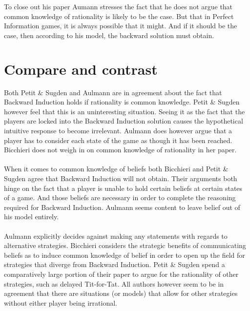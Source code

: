 \documentclass{article}
\begin{document}
\\
\\
To close out his paper Aumann stresses the fact that he does not argue that common knowledge of rationality is likely to be the case. But that in Perfect Information games, it is always possible that it might. And if it should be the case, then according to his model, the backward solution must obtain. 



















\section{Compare and contrast}

Both Petit \& Sugden and Aulmann are in agreement about the fact that Backward Induction holds if rationality is common knowledge. Petit \& Sugden however feel that this is an uninteresting situation. Seeing it as the fact that the players are locked into the Backward Induction solution causes the hypothetical intuitive response to become irrelevant. Aulmann does however argue that a player has to consider each state of the game as though it has been reached. Bicchieri does not weigh in on common knowledge of rationality in her paper.
\\
\\
When it comes to common knowledge of beliefs both Bicchieri and Petit \& Sugden agree that Backward Induction will not obtain. Their arguments both hinge on the fact that a player is unable to hold certain beliefs at certain states of a game. And those beliefs are necessary in order to complete the reasoning required for Backward Induction. Aulmann seems content to leave belief out of his model entirely.
\\
\\
Aulmann explicitly decides against making any statements with regards to alternative strategies. Bicchieri considers the strategic benefits of communicating beliefs as to induce common knowledge of belief in order to open up the field for strategies that diverge from Backward Induction. Petit & Sugden spend a comparatively large portion of their paper to argue for the rationality of other strategies, such as delayed Tit-for-Tat. All authors however seem to be in agreement that there are situations (or models) that allow for other strategies without either player being irrational.
\end{document}
